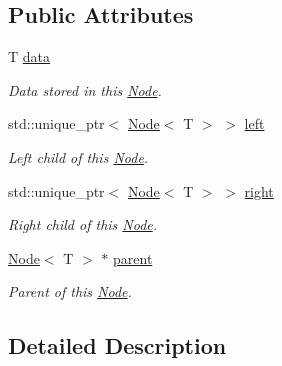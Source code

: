 \subsection*{Public Attributes}
\begin{DoxyCompactItemize}
\item 
T \hyperlink{struct_a_putils_1_1_node_aaeaf283a76b1095627efa92a98199600}{data}
\begin{DoxyCompactList}\small\item\em Data stored in this {\ttfamily \hyperlink{struct_a_putils_1_1_node}{Node}}. \end{DoxyCompactList}\item 
\mbox{\label{struct_a_putils_1_1_node_ac2536ffddf03b9680947696c234653f4}} 
std\+::unique\+\_\+ptr$<$ \hyperlink{struct_a_putils_1_1_node}{Node}$<$ T $>$ $>$ \hyperlink{struct_a_putils_1_1_node_ac2536ffddf03b9680947696c234653f4}{left}
\begin{DoxyCompactList}\small\item\em Left child of this \hyperlink{struct_a_putils_1_1_node}{Node}. \end{DoxyCompactList}\item 
\mbox{\label{struct_a_putils_1_1_node_ad42ab35caa0847c2c6cc16cc5d9f1a36}} 
std\+::unique\+\_\+ptr$<$ \hyperlink{struct_a_putils_1_1_node}{Node}$<$ T $>$ $>$ \hyperlink{struct_a_putils_1_1_node_ad42ab35caa0847c2c6cc16cc5d9f1a36}{right}
\begin{DoxyCompactList}\small\item\em Right child of this \hyperlink{struct_a_putils_1_1_node}{Node}. \end{DoxyCompactList}\item 
\mbox{\label{struct_a_putils_1_1_node_a0e9effc20e8a7a0e0ce2a37412b3c3b5}} 
\hyperlink{struct_a_putils_1_1_node}{Node}$<$ T $>$ $\ast$ \hyperlink{struct_a_putils_1_1_node_a0e9effc20e8a7a0e0ce2a37412b3c3b5}{parent}
\begin{DoxyCompactList}\small\item\em Parent of this \hyperlink{struct_a_putils_1_1_node}{Node}. \end{DoxyCompactList}\end{DoxyCompactItemize}


\subsection{Detailed Description}

